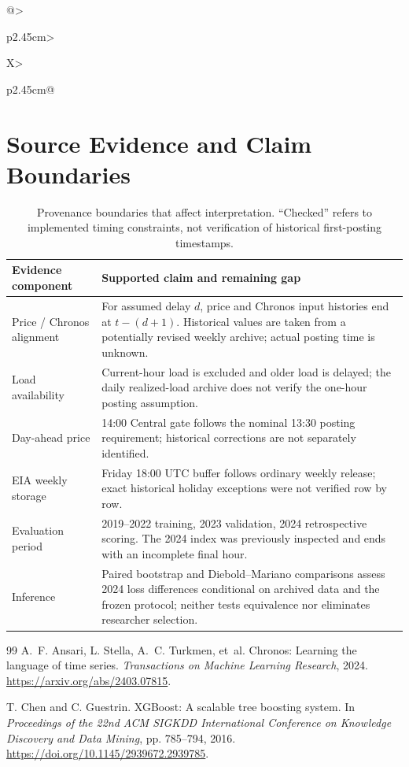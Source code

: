 \documentclass[11pt,letterpaper]{article}
\begin{document}
\begin{table}[t]
\begin{tabularx}{\linewidth}{@{}>{\raggedright\arraybackslash}p{2.45cm}>{\raggedright\arraybackslash}X>{\raggedright\arraybackslash}p{2.45cm}@{}}
\section{Source Evidence and Claim Boundaries}\label{app:evidence}
\begin{table}[h]
\centering\small
\caption{Provenance boundaries that affect interpretation. ``Checked'' refers to implemented timing constraints, not verification of historical first-posting timestamps.}\label{tab:limitations}
\begin{tabularx}{\linewidth}{@{}p{2.95cm}X@{}}
\toprule
Evidence component & Supported claim and remaining gap\\
\midrule
Price / Chronos alignment & For assumed delay $d$, price and Chronos input histories end at $t-(d+1)$. Historical values are taken from a potentially revised weekly archive; actual posting time is unknown.\\
Load availability & Current-hour load is excluded and older load is delayed; the daily realized-load archive does not verify the one-hour posting assumption.\\
Day-ahead price & 14:00 Central gate follows the nominal 13:30 posting requirement; historical corrections are not separately identified.\\
EIA weekly storage & Friday 18:00 UTC buffer follows ordinary weekly release; exact historical holiday exceptions were not verified row by row.\\
Evaluation period & 2019--2022 training, 2023 validation, 2024 retrospective scoring. The 2024 index was previously inspected and ends with an incomplete final hour.\\
Inference & Paired bootstrap and Diebold--Mariano comparisons assess 2024 loss differences conditional on archived data and the frozen protocol; neither tests equivalence nor eliminates researcher selection.\\
\bottomrule
\end{tabularx}
\end{table}

\begin{thebibliography}{99}
A.~F. Ansari, L. Stella, A.~C. Turkmen, et~al.
\newblock Chronos: Learning the language of time series.
\newblock \emph{Transactions on Machine Learning Research}, 2024.
\newblock \url{https://arxiv.org/abs/2403.07815}.

T. Chen and C. Guestrin.
\newblock XGBoost: A scalable tree boosting system.
\newblock In \emph{Proceedings of the 22nd ACM SIGKDD International Conference on Knowledge Discovery and Data Mining}, pp. 785--794, 2016.
\newblock \url{https://doi.org/10.1145/2939672.2939785}.


\end{thebibliography}
\end{tabularx}
\end{table}
\end{document}
